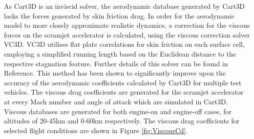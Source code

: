 		As Cart3D is an inviscid solver, the aerodynamic database generated by Cart3D lacks the forces generated by skin friction drag. In order for the aerodynamic model to more closely approximate realistic dynamics, a correction for the viscous forces on the scramjet accelerator is calculated, using the viscous correction solver VC3D\cite{Ward2018}. VC3D utilises flat plate correlations for skin friction on each surface cell, employing a simplified running length based on the Euclidean distance to the respective stagnation feature. Further details of this solver can be found in Reference\cite{Ward2018}. This method has been shown to significantly improve upon the accuracy of the aerodynamic coefficients calculated by Cart3D for multiple test vehicles\cite{Ward2018}. The viscous drag coefficients are generated for the scramjet accelerator at every Mach number and angle of attack which are simulated in Cart3D. Viscous databases are generated for both engine-on and engine-off cases, for altitudes of 20-45km and 0-60km respectively.  The viscous drag coefficients for selected flight conditions are shown in Figure \ref{fig:ViscousCd}.
		
		
		
		
